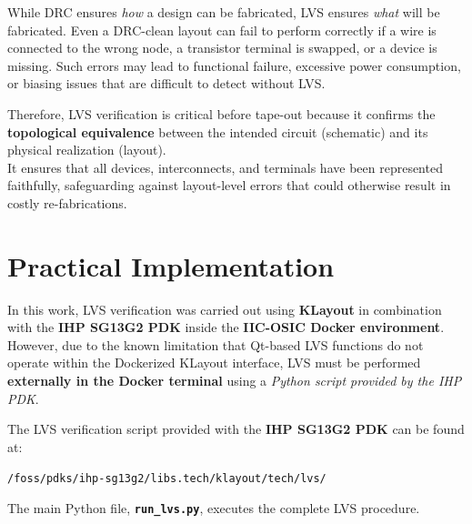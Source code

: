 \documentclass[
  11pt,
  a4paper,
  oneside]{scrbook}
\begin{document}
While DRC ensures \emph{how} a design can be fabricated, LVS ensures
\emph{what} will be fabricated. Even a DRC-clean layout can fail to
perform correctly if a wire is connected to the wrong node, a transistor
terminal is swapped, or a device is missing. Such errors may lead to
functional failure, excessive power consumption, or biasing issues that
are difficult to detect without LVS.

Therefore, LVS verification is critical before tape-out because it
confirms the \textbf{topological equivalence} between the intended
circuit (schematic) and its physical realization (layout).\\
It ensures that all devices, interconnects, and terminals have been
represented faithfully, safeguarding against layout-level errors that
could otherwise result in costly re-fabrications.

\section{Practical Implementation}\label{practical-implementation}

In this work, LVS verification was carried out using \textbf{KLayout} in
combination with the \textbf{IHP SG13G2 PDK} inside the \textbf{IIC-OSIC
Docker environment}.\\
However, due to the known limitation that Qt-based LVS functions do not
operate within the Dockerized KLayout interface, LVS must be performed
\textbf{externally in the Docker terminal} using a \emph{Python script
provided by the IHP PDK}.

\begin{tcolorbox}[enhanced jigsaw, opacityback=0, breakable, colback=white, left=2mm, toprule=.15mm, arc=.35mm, coltitle=black, leftrule=.75mm, colbacktitle=quarto-callout-note-color!10!white, rightrule=.15mm, colframe=quarto-callout-note-color-frame, titlerule=0mm, title=\textcolor{quarto-callout-note-color}{\faInfo}\hspace{0.5em}{LVS Script}, toptitle=1mm, bottomtitle=1mm, bottomrule=.15mm, opacitybacktitle=0.6]

The LVS verification script provided with the \textbf{IHP SG13G2 PDK}
can be found at:

\texttt{/foss/pdks/ihp-sg13g2/libs.tech/klayout/tech/lvs/}

The main Python file, \textbf{\texttt{run\_lvs.py}}, executes the
complete LVS procedure.

\end{tcolorbox}
\end{document}
